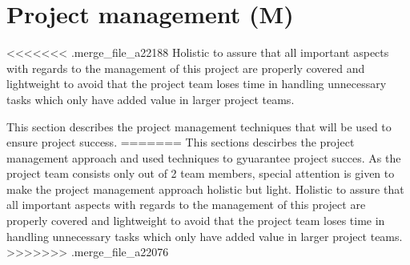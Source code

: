 \section{Project management (M)}
\label{sec:project-management}
<<<<<<< .merge_file_a22188
Holistic to assure that all important aspects with regards to the management of this project are properly covered and lightweight to avoid that the project team loses time in handling unnecessary tasks which only have added value in larger project teams. 

This section describes the project management techniques that will be used to ensure project success.
=======
This sections descirbes the project management approach and used techniques to gyuarantee project succes.
As the project team consists only out of 2 team members, special attention is given to make the project management approach holistic but light.
Holistic to assure that all important aspects with regards to the management of this project are properly covered and lightweight to avoid that the project team loses time in handling unnecessary tasks which only have added value in larger project teams.
>>>>>>> .merge_file_a22076
